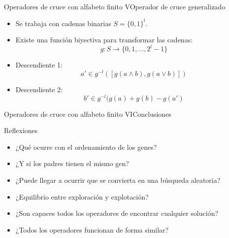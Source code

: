 \documentclass[10pt]{beamer}
\begin{document}
\begin{frame}{Operadores de cruce con alfabeto finito V}{Operador de cruce generalizado}
		\begin{itemize}
			\item Se trabaja con cadenas binarias $ S = \{0,1\}^l$.
			\item Existe una función biyectiva para transformar las cadenas:
				$$ g: S \to \{0, 1, ..., 2^l - 1\}$$
			\item Descendiente 1:
				$$ a' \in g^{-l} ([g(a \wedge b), g(a \lor b)]) $$
			\item Descendiente 2:
				$$ b' \in g^{-l} (g(a) + g(b) - g(a') $$
				
				
		\end{itemize}
		
\end{frame}

\begin{frame}{Operadores de cruce con alfabeto finito VI}{Conclusiones}
	\begin{block}{Reflexiones}
	\begin{itemize}
		\setlength\itemsep{1em}
		\item ¿Qué ocurre con el ordenamiento de los genes?
		\item ¿Y si los padres tienen el mismo gen?
		\item ¿Puede llegar a ocurrir que se convierta en una búsqueda aleatoria?
		\item ¿Equilibrio entre exploración y explotación?
		\item ¿Son capaces todos los operadores de encontrar cualquier solución?
		\item ¿Todos los operadores funcionan de forma similar?
	\end{itemize}
\end{block}
\end{frame}
\end{document}
